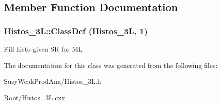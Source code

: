 \subsection{Member Function Documentation}
\hypertarget{classHistos__3L_a7d0bc7498db9a0508da4d58188746ae0}{
\subsubsection[{ClassDef}]{\setlength{\rightskip}{0pt plus 5cm}Histos\_\-3L::ClassDef ({\bf Histos\_\-3L}, \/  1)}}
\label{classHistos__3L_a7d0bc7498db9a0508da4d58188746ae0}
Fill histo given SR for ML 

The documentation for this class was generated from the following files:\begin{DoxyCompactItemize}
\item 
SusyWeakProdAna/Histos\_\-3L.h\item 
Root/Histos\_\-3L.cxx\end{DoxyCompactItemize}

